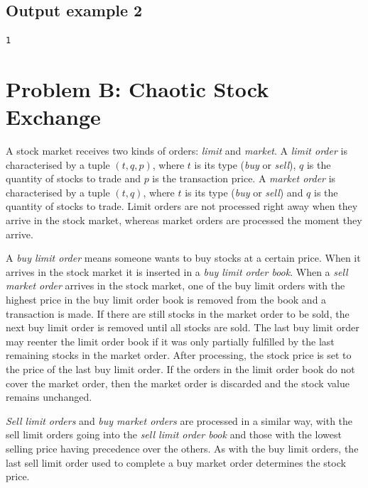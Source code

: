 \documentclass[11pt]{report}
\begin{document}
\subsection*{Output example 2}

\begin{verbatim}
1
\end{verbatim}

\clearpage

\section*{Problem B: Chaotic Stock Exchange}

A stock market receives two kinds of orders: \emph{limit} and
\emph{market}. A \emph{limit order} is characterised by a tuple $(t,
q, p)$, where $t$ is its type (\emph{buy} or \emph{sell}), $q$ is the
quantity of stocks to trade and $p$ is the transaction price. A
\emph{market order} is characterised by a tuple $(t, q)$, where $t$ is
its type (\emph{buy} or \emph{sell}) and $q$ is the quantity of stocks
to trade. Limit orders are not processed right away when they arrive
in the stock market, whereas market orders are processed the moment
they arrive.

A \emph{buy limit order} means someone wants to buy stocks at a
certain price. When it arrives in the stock market it is inserted in a
\emph{buy limit order book}. When a \emph{sell market order} arrives
in the stock market, one of the buy limit orders with the highest
price in the buy limit order book is removed from the book and a
transaction is made. If there are still stocks in the market order to
be sold, the next buy limit order is removed until all stocks are
sold. The last buy limit order may reenter the limit order book if it
was only partially fulfilled by the last remaining stocks in the
market order. After processing, the stock price is set to the price of
the last buy limit order. If the orders in the limit order book do not
cover the market order, then the market order is discarded and the
stock value remains unchanged.

\emph{Sell limit orders} and \emph{buy market orders} are processed in
a similar way, with the sell limit orders going into the \emph{sell
  limit order book} and those with the lowest selling price having
precedence over the others. As with the buy limit orders, the last
sell limit order used to complete a buy market order determines the
stock price.
\end{document}
